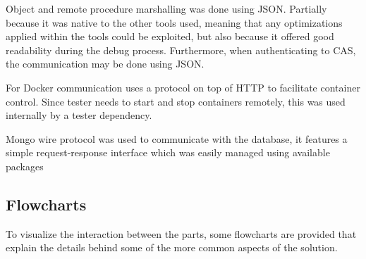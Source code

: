 Object and remote procedure marshalling was done using JSON. Partially because it was native to the other tools used, meaning that any optimizations applied within the tools could be exploited, but also because it offered good readability during the debug process. Furthermore, when authenticating to CAS, the communication may be done using JSON.

For Docker communication uses a protocol on top of HTTP to facilitate container control. Since tester needs to start and stop containers remotely, this was used internally by a tester dependency.

Mongo wire protocol was used to communicate with the database, it features a simple request-response interface which was easily managed using available packages

\subsection{Flowcharts}
To visualize the interaction between the parts, some flowcharts are provided that explain the details behind some of the more common aspects of the solution. 
